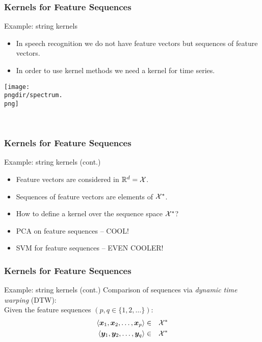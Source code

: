 \begin{frame}
	\frametitle{Kernels for Feature Sequences}

	\begin{ovalblock}{Example: string kernels}
		\begin{itemize}
			\item In speech recognition we do not have feature vectors but sequences of feature vectors.
			\item In order to use kernel methods we need a kernel for time series.
		\end{itemize}

		\begin{center}
			\quad
			\texttt{[image: \\pngdir/spectrum.\\png]}
		\end{center}
		~
	\end{ovalblock}
\end{frame}


\begin{frame}
	\frametitle{Kernels for Feature Sequences \cont}

	\begin{ovalblock}{Example: string kernels (cont.)}
		\begin{itemize}
			\item Feature vectors are considered in $\real^d =\cal X$.
			\item Sequences of feature vectors are elements of $\cal X^*$.
			\item {} How to define a kernel over the sequence space $\cal X^*$? \\[.5cm]
		\end{itemize}

		\begin{itemize}
			\item PCA on feature sequences -- COOL!
			\item SVM for feature sequences -- EVEN COOLER!
		\end{itemize}
	\end{ovalblock}
\end{frame}


\begin{frame}
	\frametitle{Kernels for Feature Sequences \cont}

	\begin{ovalblock}{Example: string kernels (cont.)}
		Comparison of sequences via \emph{dynamic time warping} (DTW): \\[.5cm]

		Given the feature sequences $(p, q\in \{1,2,\dots\})$:
		\begin{eqnarray*}
			\langle \vec x_1, \vec x_2, \dots, \vec x_p\rangle & \in & {\cal X^*} \\
			\langle \vec y_1, \vec y_2, \dots, \vec y_q\rangle & \in & {\cal X^*}
		\end{eqnarray*}
	\end{ovalblock}
\end{frame}


